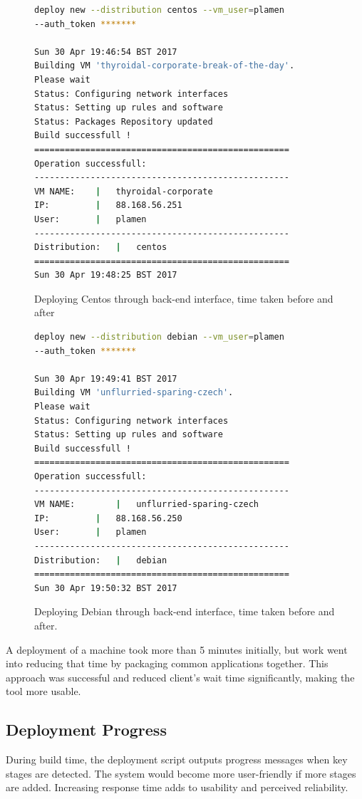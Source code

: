 \documentclass{article}
\begin{document}
\begin{figure}
\begin{lstlisting}[frame=single, language=Bash]
deploy new --distribution centos --vm_user=plamen 
--auth_token *******

Sun 30 Apr 19:46:54 BST 2017
Building VM 'thyroidal-corporate-break-of-the-day'.
Please wait 
Status: Configuring network interfaces
Status: Setting up rules and software
Status: Packages Repository updated
Build successfull !
==================================================
Operation successfull:
--------------------------------------------------
VM NAME:    |	thyroidal-corporate
IP:			|	88.168.56.251
User:		|	plamen
--------------------------------------------------
Distribution:	|	centos
==================================================
Sun 30 Apr 19:48:25 BST 2017

\end{lstlisting}
\caption{Deploying Centos through back-end interface, time taken before and after}
\label{fig:deeploy-centos-output}
\end{figure}

\begin{figure}
\begin{lstlisting}[frame=single, language=Bash]
deploy new --distribution debian --vm_user=plamen 
--auth_token *******

Sun 30 Apr 19:49:41 BST 2017
Building VM 'unflurried-sparing-czech'.
Please wait 
Status: Configuring network interfaces
Status: Setting up rules and software
Build successfull !
==================================================
Operation successfull:
--------------------------------------------------
VM NAME:		|	unflurried-sparing-czech
IP:			|	88.168.56.250
User:		|	plamen
--------------------------------------------------
Distribution:	|	debian
==================================================
Sun 30 Apr 19:50:32 BST 2017
\end{lstlisting}
\caption{Deploying Debian through back-end interface, time taken before and after.}
\label{fig:deeploy-debian-output}
\end{figure}

A deployment of a machine took more than 5 minutes initially, but work went into reducing that time by packaging common applications together. This approach was successful and reduced client's wait time significantly, making the tool more usable.

\subsection{Deployment Progress}
During build time, the deployment script outputs progress messages when key stages are detected. The system would become more user-friendly if more stages are added. Increasing response time adds to usability and perceived reliability.
\end{document}
